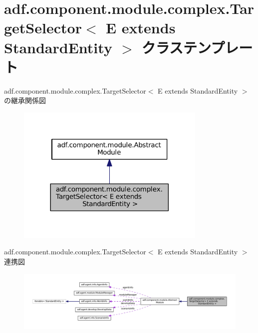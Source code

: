 \hypertarget{classadf_1_1component_1_1module_1_1complex_1_1TargetSelector}{}\section{adf.\+component.\+module.\+complex.\+Target\+Selector$<$ E extends Standard\+Entity $>$ クラステンプレート}
\label{classadf_1_1component_1_1module_1_1complex_1_1TargetSelector}


adf.\+component.\+module.\+complex.\+Target\+Selector$<$ E extends Standard\+Entity $>$ の継承関係図
\nopagebreak
\begin{figure}[H]
\begin{center}
\leavevmode
\includegraphics[width=257pt]{classadf_1_1component_1_1module_1_1complex_1_1TargetSelector__inherit__graph}
\end{center}
\end{figure}


adf.\+component.\+module.\+complex.\+Target\+Selector$<$ E extends Standard\+Entity $>$ 連携図
\nopagebreak
\begin{figure}[H]
\begin{center}
\leavevmode
\includegraphics[width=350pt]{classadf_1_1component_1_1module_1_1complex_1_1TargetSelector__coll__graph}
\end{center}
\end{figure}
